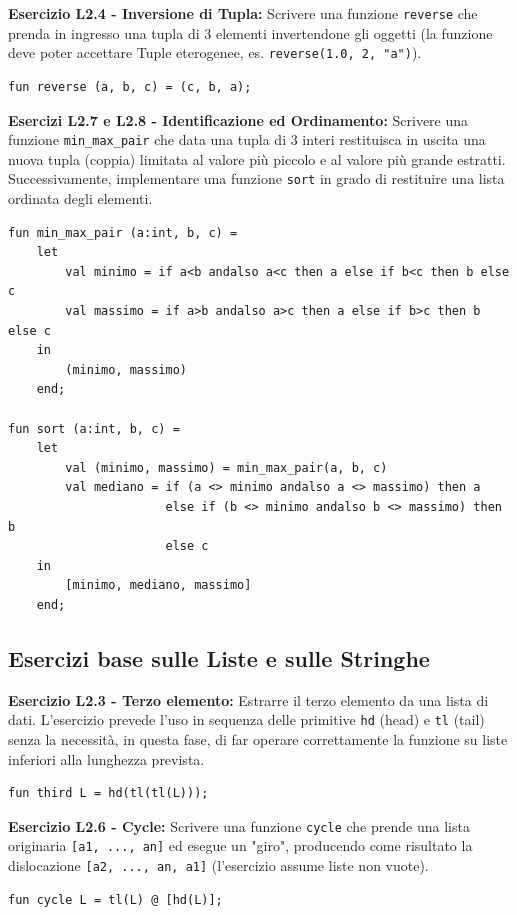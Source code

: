 \documentclass[12pt, a4paper]{article}
\begin{document}
\textbf{Esercizio L2.4 - Inversione di Tupla:}
Scrivere una funzione \texttt{reverse} che prenda in ingresso una tupla di 3 elementi invertendone gli oggetti (la funzione deve poter accettare Tuple eterogenee, es. \texttt{reverse(1.0, 2, "a")}).
\begin{verbatim}
fun reverse (a, b, c) = (c, b, a);
\end{verbatim}

\textbf{Esercizi L2.7 e L2.8 - Identificazione ed Ordinamento:}
Scrivere una funzione \texttt{min\_max\_pair} che data una tupla di 3 interi restituisca in uscita una nuova tupla (coppia) limitata al valore più piccolo e al valore più grande estratti. Successivamente, implementare una funzione \texttt{sort} in grado di restituire una lista ordinata degli elementi.
\begin{verbatim}
fun min_max_pair (a:int, b, c) =
    let
        val minimo = if a<b andalso a<c then a else if b<c then b else c
        val massimo = if a>b andalso a>c then a else if b>c then b else c
    in
        (minimo, massimo)
    end;

fun sort (a:int, b, c) =
    let
        val (minimo, massimo) = min_max_pair(a, b, c)
        val mediano = if (a <> minimo andalso a <> massimo) then a 
                      else if (b <> minimo andalso b <> massimo) then b 
                      else c
    in
        [minimo, mediano, massimo]
    end;
\end{verbatim}

\subsection{Esercizi base sulle Liste e sulle Stringhe}

\textbf{Esercizio L2.3 - Terzo elemento:}
Estrarre il terzo elemento da una lista di dati. L'esercizio prevede l'uso in sequenza delle primitive \texttt{hd} (head) e \texttt{tl} (tail) senza la necessità, in questa fase, di far operare correttamente la funzione su liste inferiori alla lunghezza prevista.
\begin{verbatim}
fun third L = hd(tl(tl(L)));
\end{verbatim}

\textbf{Esercizio L2.6 - Cycle:}
Scrivere una funzione \texttt{cycle} che prende una lista originaria \texttt{[a1, ..., an]} ed esegue un "giro", producendo come risultato la dislocazione \texttt{[a2, ..., an, a1]} (l'esercizio assume liste non vuote).
\begin{verbatim}
fun cycle L = tl(L) @ [hd(L)];
\end{verbatim}
\end{document}
